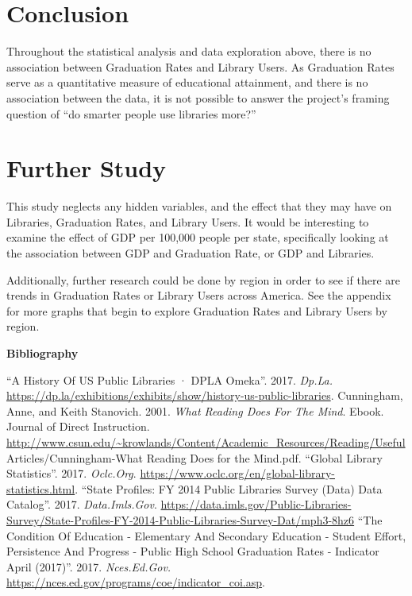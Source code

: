 \documentclass[12pt,]{article}
\begin{document}
\newpage

\section{Conclusion}\label{conclusion}

Throughout the statistical analysis and data exploration above, there is
no association between Graduation Rates and Library Users. As Graduation
Rates serve as a quantitative measure of educational attainment, and
there is no association between the data, it is not possible to answer
the project's framing question of ``do smarter people use libraries
more?''

\section{Further Study}\label{further-study}

This study neglects any hidden variables, and the effect that they may
have on Libraries, Graduation Rates, and Library Users. It would be
interesting to examine the effect of GDP per 100,000 people per state,
specifically looking at the association between GDP and Graduation Rate,
or GDP and Libraries.

Additionally, further research could be done by region in order to see
if there are trends in Graduation Rates or Library Users across America.
See the appendix for more graphs that begin to explore Graduation Rates
and Library Users by region.

\newpage

\begin{center}
\textbf{Bibliography}
\end{center}

 \noindent
``A History Of US Public Libraries · DPLA Omeka''. 2017. \emph{Dp.La.}
\url{https://dp.la/exhibitions/exhibits/show/history-us-public-libraries}.
\newline
\newline
\noindent
Cunningham, Anne, and Keith Stanovich. 2001. \emph{What Reading Does For
The Mind}. Ebook. Journal of Direct Instruction.
\url{http://www.csun.edu/~krowlands/Content/Academic_Resources/Reading/Useful}
Articles/Cunningham-What Reading Does for the Mind.pdf. \newline
\newline
\noindent
``Global Library Statistics''. 2017. \emph{Oclc.Org}.
\url{https://www.oclc.org/en/global-library-statistics.html}. \newline
\newline
\noindent
``State Profiles: FY 2014 Public Libraries Survey (Data) \textbar{} Data
Catalog''. 2017. \emph{Data.Imls.Gov}.
\url{https://data.imls.gov/Public-Libraries-Survey/State-Profiles-FY-2014-Public-Libraries-Survey-Dat/mph3-8hz6}
\newline
\newline
\noindent
``The Condition Of Education - Elementary And Secondary Education -
Student Effort, Persistence And Progress - Public High School Graduation
Rates - Indicator April (2017)''. 2017. \emph{Nces.Ed.Gov.}
\url{https://nces.ed.gov/programs/coe/indicator_coi.asp}.
\end{document}
